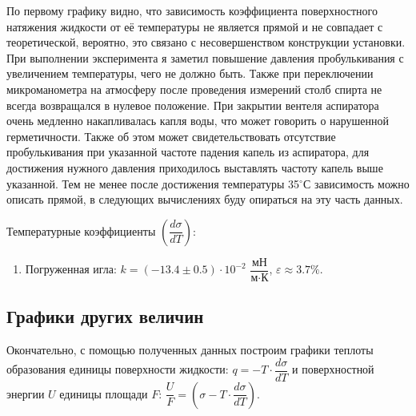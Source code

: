 \documentclass[a4paper,12pt]{article}
\theoremstyle{definition}
\begin{document}
	По первому графику видно, что зависимость коэффициента поверхностного натяжения жидкости от её температуры не является прямой и не совпадает с теоретической,
	вероятно, это связано с несовершенством конструкции установки. При выполнении эксперимента я заметил повышение давления пробулькивания с увеличением температуры, чего не должно быть. Также при переключении микроманометра на атмосферу после проведения 
	измерений столб спирта не всегда возвращался в нулевое положение. При закрытии вентеля аспиратора очень медленно накапливалась капля воды, что может говорить о нарушенной герметичности.
	Также об этом может свидетельствовать отсутствие пробулькивания при указанной частоте падения капель из аспиратора, для достижения нужного давления приходилось выставлять частоту капель выше указанной. 
	Тем не менее после достижения температуры 35$^\circ$С зависимость можно описать прямой, в следующих вычислениях буду опираться на эту часть данных.

	
	Температурные коэффициенты $\left(\dfrac{d\sigma}{dT}\right)$:
	\begin{enumerate}
		\item Погруженная игла: $k = (-13.4\pm 0.5)\cdot 10^{-2}$ $\dfrac{\text{мН}}{\text{м}\cdot \text{К}}$, $\varepsilon \approx 3.7\%$.
	\end{enumerate}

	\subsection{Графики других величин}
	
	Окончательно, с помощью полученных данных построим графики теплоты образования единицы поверхности жидкости: $q = - T\cdot\dfrac{d\sigma}{dT}$ и поверхностной энергии $U$ единицы площади $F$: $\dfrac{U}{F} = \left(\sigma - T\cdot\dfrac{d\sigma}{dT}\right)$.
	
\end{document}
